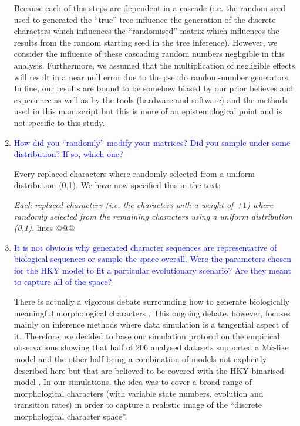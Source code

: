 \documentclass[12pt,letterpaper]{article}
\begin{document}
\begin{enumerate}
Because each of this steps are dependent in a cascade (i.e. the random seed used to generated the ``true'' tree influence the generation of the discrete characters which influences the ``randomised'' matrix which influences the results from the random starting seed in the tree inference).
However, we consider the influence of these cascading random numbers negligible in this analysis.
Furthermore, we assumed that the multiplication of negligible effects will result in a near null error due to the pseudo random-number generators.
In fine, our results are bound to be somehow biased by our prior believes and experience as well as by the tools (hardware and software) and the methods used in this manuscript but this is more of an epistemological point and is not specific to this study.

\item{\textcolor{blue}{How did you ``randomly'' modify your matrices? Did you sample under some distribution? If so, which one?}}

Every replaced characters where randomly selected from a uniform distribution (0,1). We have now specified this in the text:

\textit{Each replaced characters (i.e. the characters with a weight of +$1$) where randomly selected from the remaining characters using a uniform distribution (0,1).} lines @@@

\item{\textcolor{blue}{It is not obvious why generated character sequences are representative of biological sequences or sample the space overall. Were the parameters chosen for the HKY model to fit a particular evolutionary scenario? Are they meant to capture all of the space?}}

There is actually a vigorous debate surrounding how to generate biologically meaningful morphological characters \citep[][;confidential reviews and personal communications witht he authors]{OReilly20160081,goloboff2017weighted,puttick2017uncertain,GoloboffEmpirical,OReillyEmpirical}.
This ongoing debate, however, focuses mainly on inference methods where data simulation is a tangential aspect of it.
Therefore, we decided to base our simulation protocol on the empirical observations showing that half of 206 analysed datasets supported a M$k$-like model \citep[][Fig. 3]{Wright01072016} and the other half being a combination of models not explicitly described here but that are believed to be covered with the HKY-binarised model \citep{puttick2017uncertain,OReillyEmpirical}.
In our simulations, the idea was to cover a broad range of morphological characters (with variable state numbers, evolution and transition rates) in order to capture a realistic image of the ``discrete morphological character space''.


\end{enumerate}
\end{document}
